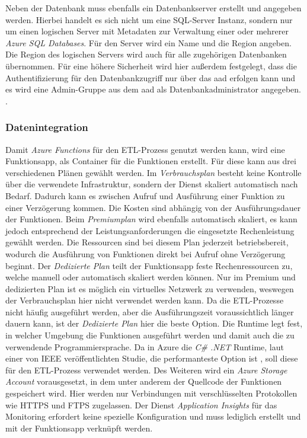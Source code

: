 Neben der Datenbank muss ebenfalls ein Datenbankserver erstellt und angegeben werden. Hierbei handelt es sich nicht um eine SQL-Server Instanz, sondern nur um einen logischen Server mit Metadaten zur Verwaltung einer oder mehrerer \textit{Azure SQL Databases}. Für den Server wird ein Name und die Region angeben. Die Region des logischen Servers wird auch für alle zugehörigen Datenbanken übernommen. Für eine höhere Sicherheit wird hier außerdem festgelegt, dass die Authentifizierung für den Datenbankzugriff nur über das \ac{aad} erfolgen kann und es wird eine Admin-Gruppe aus dem \ac{aad} als Datenbankadministrator angegeben. \cite[vgl.][]{ward_azure_2021}.

\subsubsection{Datenintegration} \label{subsec:infra:konfig:functions}
Damit \textit{Azure Functions} für den ETL-Prozess genutzt werden kann, wird eine Funktionsapp, als Container für die Funktionen erstellt. Für diese kann aus drei verschiedenen Plänen gewählt werden. Im \textit{Verbrauchsplan} besteht keine Kontrolle über die verwendete Infrastruktur, sondern der Dienst skaliert automatisch nach Bedarf. Dadurch kann es zwischen Aufruf und Ausführung einer Funktion zu einer Verzögerung kommen. Die Kosten sind abhängig von der Ausführungsdauer der Funktionen. Beim \textit{Premiumplan} wird ebenfalls automatisch skaliert, es kann jedoch entsprechend der Leistungsanforderungen die eingesetzte Rechenleistung gewählt werden. Die Ressourcen sind bei diesem Plan jederzeit betriebsbereit, wodurch die Ausführung von Funktionen direkt bei Aufruf ohne Verzögerung beginnt. Der \textit{Dedizierte Plan} teilt der Funktionsapp feste Rechenressourcen zu, welche manuell oder automatisch skaliert werden können. Nur im Premium und dedizierten Plan ist es möglich ein virtuelles Netzwerk zu verwenden, weswegen der Verbrauchsplan hier nicht verwendet werden kann. Da die ETL-Prozesse nicht häufig ausgeführt werden, aber die Ausführungszeit voraussichtlich länger dauern kann, ist der \textit{Dedizierte Plan} hier die beste Option. Die Runtime legt fest, in welcher Umgebung die Funktionen ausgeführt werden und damit auch die zu verwendende Programmiersprache. Da in Azure die \textit{C\# .NET} Runtime, laut einer von IEEE veröffentlichten Studie, die performanteste Option ist \cite{jackson_investigation_2018}, soll diese für den ETL-Prozess verwendet werden. Des Weiteren wird ein \textit{Azure Storage Account} vorausgesetzt, in dem unter anderem der Quellcode der Funktionen gespeichert wird. Hier werden nur Verbindungen mit verschlüsselten Protokollen wie HTTPS und FTPS zugelassen. Der Dienst \textit{Application Insights} für das Monitoring erfordert keine spezielle Konfiguration und muss lediglich erstellt und mit der Funktionsapp verknüpft werden. \cite[vgl.][]{satapathi_hands-azure_2021}

